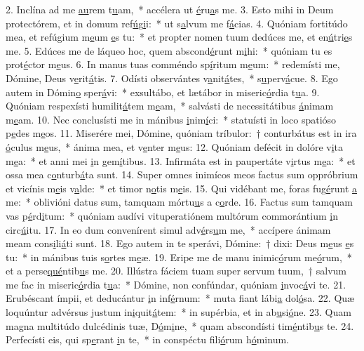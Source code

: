2. Inclína ad me \uline{au}rem t\uline{u}am,~* accélera ut \uline{é}ru\uline{a}s me.
3. Esto mihi in Deum protectórem, et in domum ref\uline{ú}g\uline{i}i:~* ut s\uline{a}lvum me f\uline{á}cias.
4. Quóniam fortitúdo mea, et refúgium m\uline{e}um \uline{e}s tu:~* et propter nomen tuum dedúces me, et en\uline{ú}tri\uline{e}s me.
5. Edúces me de láqueo hoc, quem abscond\uline{é}runt m\uline{i}hi:~* quóniam tu es prot\uline{é}ctor m\uline{e}us.
6. In manus tuas comméndo sp\uline{í}ritum m\uline{e}um:~* redemísti me, Dómine, Deus v\uline{e}rit\uline{á}tis.
7. Odísti observántes v\uline{a}nit\uline{á}tes,~* s\uline{u}perv\uline{á}cue.
8. Ego autem in Dómin\uline{o} sper\uline{á}vi:~* exsultábo, et lætábor in miseric\uline{ó}rdia t\uline{u}a.
9. Quóniam respexísti humilit\uline{á}tem m\uline{e}am,~* salvásti de necessitátibus \uline{á}nimam m\uline{e}am.
10. Nec conclusísti me in mánibus \uline{i}nim\uline{í}ci:~* statuísti in loco spatióso p\uline{e}des m\uline{e}os.
11. Miserére mei, Dómine, quóniam tríbulor:~† conturbátus est in ira \uline{ó}culus m\uline{e}us,~* ánima mea, et v\uline{e}nter m\uline{e}us:
12. Quóniam defécit in dolóre v\uline{i}ta m\uline{e}a:~* et anni mei \uline{i}n gem\uline{í}tibus.
13. Infirmáta est in paupertáte v\uline{i}rtus m\uline{e}a:~* et ossa mea c\uline{o}nturb\uline{á}ta sunt.
14. Super omnes inimícos meos factus sum oppróbrium et vicínis m\uline{e}is v\uline{a}lde:~* et timor n\uline{o}tis m\uline{e}is.
15. Qui vidébant me, foras fug\uline{é}runt \uline{a} me:~* oblivióni datus sum, tamquam mórtu\uline{u}s a c\uline{o}rde.
16. Factus sum tamquam vas p\uline{é}rd\uline{i}tum:~* quóniam audívi vituperatiónem multórum commorántium \uline{i}n circ\uline{ú}itu.
17. In eo dum convenírent simul adv\uline{é}rs\uline{u}m me,~* accípere ánimam meam cons\uline{i}li\uline{á}ti sunt.
18. Ego autem in te sperávi, Dómine:~† dixi: Deus m\uline{e}us \uline{e}s tu:~* in mánibus tuis s\uline{o}rtes m\uline{e}æ.
19. Eripe me de manu inimic\uline{ó}rum me\uline{ó}rum,~* et a perse\uline{qué}ntib\uline{u}s me.
20. Illústra fáciem tuam super servum tuum,~† salvum me fac in miseric\uline{ó}rdia t\uline{u}a:~* Dómine, non confúndar, quóniam \uline{i}nvoc\uline{á}vi te.
21. Erubéscant ímpii, et deducántur \uline{i}n inf\uline{é}rnum:~* muta fiant lábi\uline{a} dol\uline{ó}sa.
22. Quæ loquúntur advérsus justum in\uline{i}quit\uline{á}tem:~* in supérbia, et in ab\uline{u}si\uline{ó}ne.
23. Quam magna multitúdo dulcédinis tuæ, D\uline{ó}m\uline{i}ne,~* quam abscondísti tim\uline{é}ntib\uline{u}s te.
24. Perfecísti eis, qui sp\uline{e}rant \uline{i}n te,~* in conspéctu fili\uline{ó}rum h\uline{ó}minum.
